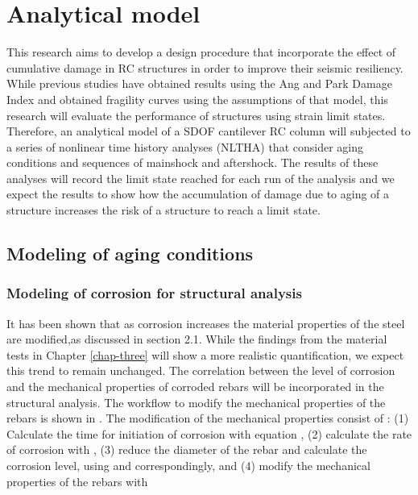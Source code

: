 \chapter{Analytical model}
\label{chap-five}
This research aims to develop a design procedure that incorporate the effect of cumulative damage in RC structures in order to improve their seismic resiliency. While previous studies have obtained results using the Ang and Park Damage Index and obtained fragility curves using the assumptions of that model, this research will evaluate the performance of structures using strain limit states. Therefore, an analytical model of a SDOF cantilever RC column will subjected to a series of nonlinear time history analyses (NLTHA) that consider aging conditions and sequences of mainshock and aftershock. The results of these analyses will record the limit state reached for each run of the analysis and we expect the results to show how the accumulation of damage due to aging of a structure increases the risk of a structure to reach a limit state. 

\section{Modeling of aging conditions}

\subsection{Modeling of corrosion for structural analysis}

It has been shown that as corrosion increases the material properties of the steel are modified,as discussed in section 2.1. While the findings from the material tests in Chapter \ref{chap-three} will show a more realistic quantification, we expect this trend to remain unchanged. The correlation between the level of corrosion and the mechanical properties of corroded rebars will be incorporated in the structural analysis. The workflow to modify the mechanical properties of the rebars is shown in . The modification of the mechanical properties consist of : (1) Calculate  the time for initiation of corrosion with equation , (2) calculate the rate of corrosion with , (3) reduce the diameter of the rebar and calculate the corrosion level, using  and  correspondingly, and (4) modify the mechanical properties of the rebars with 

